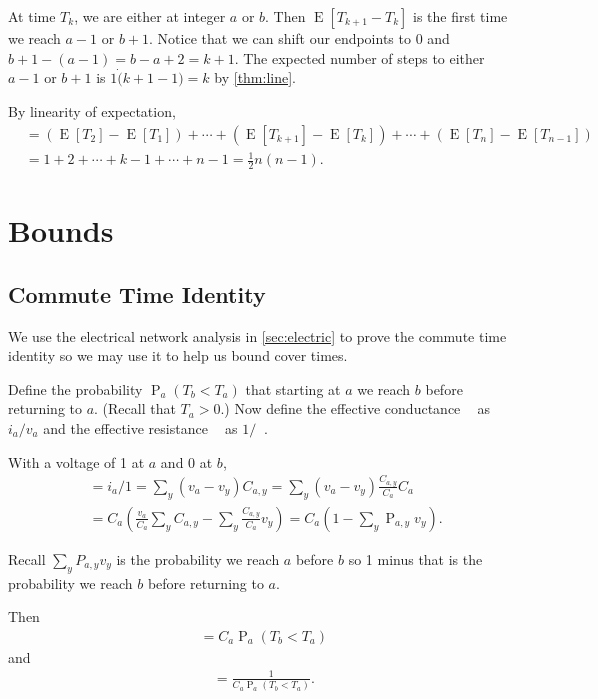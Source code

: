 \documentclass[12pt]{article}
\theoremstyle{definition}
\DeclareMathOperator{\E}{\mathrm{E}}		     %
\DeclareMathOperator{\pr}{\mathrm{P}}		     %
\DeclareMathOperator{\tcov}{t_\textrm{cov}}      %
\DeclareMathOperator{\Ceff}{C_\textrm{eff}}      %
\DeclareMathOperator{\Reff}{R_{\textrm{eff}}}    %
\begin{document}
At time $T_{k}$, we are either at integer $a$ or $b$.
Then $\E[T_{k+1}-T_{k}]$ is the first time we reach $a-1$ or $b+1$.
Notice that we can shift our endpoints to 0 and $b+1-(a-1) = b-a + 2 = k+1$.
The expected number of steps to either $a-1$ or $b+1$
is $1\dot (k+1-1) = k$ by \cref{thm:line}.

By linearity of expectation,
\begin{align}
\tcov &=  (\E[T_2] - \E[T_1]) + \cdots +
(\E[T_{k+1}] - \E[T_{k}]) + \cdots + (\E[T_n] - \E[T_{n-1}]) \nonumber\\
&= 1 + 2 + \cdots + k-1 + \cdots + n-1  = \frac{1}{2}n(n-1). \nonumber
\end{align}

\section{Bounds}\label{sec:bounds}

\subsection{Commute Time Identity} \label{sec:commute}
\cite{DS84} We use the electrical network analysis in \cref{sec:electric} to 
prove the commute time identity so we may use it to help us bound
cover times.

Define the probability $\pr_a(T_b < T_a)$ that starting at $a$
we reach $b$ before returning to $a$.
(Recall that $T_a>0$.)
Now define the effective conductance $\Ceff$ as $i_a/v_a$
and the effective resistance $\Reff$ as $1/\Ceff$.

With a voltage of 1 at $a$ and 0 at $b$,
\begin{align}
\Ceff &= i_a/1 =
\sum_y (v_a - v_y) C_{a,y} =
\sum_y (v_a - v_y) \frac{C_{a,y}}{C_a} C_a \nonumber \\
&= C_a (\frac{v_a}{C_a} \sum_y C_{a,y} - \sum_y \frac{C_{a,y}}{C_a} v_y)=
C_a(1-\sum_y\pr_{a,y}v_y).\nonumber
\end{align}

Recall $\sum_y P_{a,y} v_y$ is the probability we reach $a$ before $b$
so 1 minus that is the probability we reach $b$ before returning to $a$.

Then
\begin{align}
\Ceff = C_a \pr_a(T_b < T_a) \nonumber
\end{align}
and
\begin{align}
\Reff = \frac{1}{C_a \pr_a(T_b < T_a)}. \nonumber
\end{align}
\end{document}
